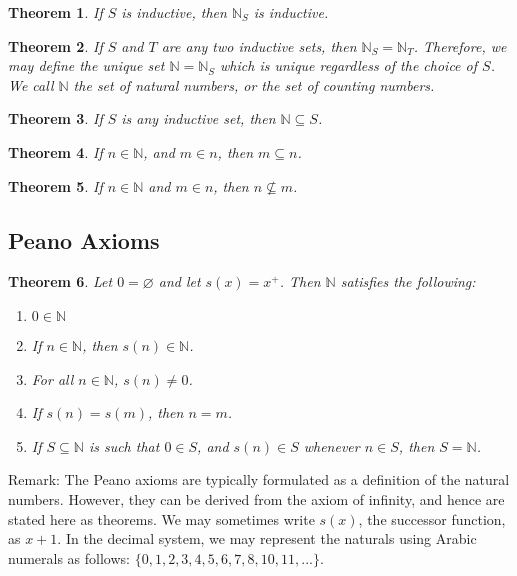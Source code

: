 \documentclass[a4paper]{article}
\newtheorem{mytheorem}{Theorem}
\numberwithin{mytheorem}{section}
\numberwithin{mydef}{section}
\numberwithin{axiom}{section}
\numberwithin{example}{section}
\begin{document}
\begin{mytheorem} If $S$ is inductive, then $\mathbb{N}_{S}$ is inductive.
\end{mytheorem}

\begin{mytheorem} If $S$ and $T$ are any two inductive sets, then  $\mathbb{N}_{S} =  \mathbb{N}_{T}$. Therefore, we may define the unique set $\mathbb{N} = \mathbb{N}_{S}$ which is unique regardless of the choice of $S$. We call $\mathbb{N}$ the set of natural numbers, or the set of counting numbers.
\end{mytheorem}

\begin{mytheorem} If $S$ is any inductive set, then $\mathbb{N} \subseteq S$. 
\end{mytheorem}

\begin{mytheorem} If $n \in \mathbb{N}$, and $m \in n$, then $m \subseteq n$.
\end{mytheorem}

\begin{mytheorem} If $n \in \mathbb{N}$ and $m \in n$, then $n \not\subseteq m$.
\end{mytheorem}

\subsection{Peano Axioms}

\begin{mytheorem} Let $0 = \varnothing$ and let $s(x) = x^{+}$. Then $\mathbb{N}$ satisfies the following:
\begin{enumerate}
\item $0 \in \mathbb{N}$
\item If $n \in \mathbb{N}$, then $s(n) \in \mathbb{N}$.
\item For all $n \in \mathbb{N}$, $s(n) \neq 0$.
\item If $s(n) = s(m)$, then $n = m$. 
\item If $S \subseteq \mathbb{N}$ is such that $0 \in S$, and $s(n) \in S$ whenever $n \in S$, then $S = \mathbb{N}$.
\end{enumerate}
\end{mytheorem}

Remark: The Peano axioms are typically formulated as a definition of the natural numbers. However, they can be derived from the axiom of infinity, and hence are stated here as theorems. We may sometimes write $s(x)$, the successor function, as $x + 1$. In the decimal system, we may represent the naturals using Arabic numerals as follows: $\{0,1,2,3,4,5,6,7,8,10,11,... \}$. 
\end{document}
